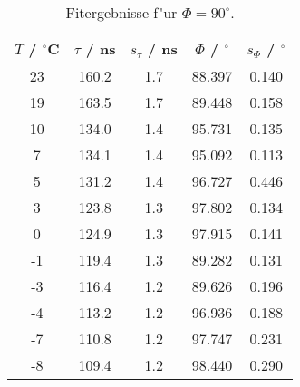 \begin{table}[H]
\caption{Fitergebnisse f"ur $\Phi=90^\circ$.}
\begin{center}
\begin{tabular}{|c|c|c|c|c|}
  \hline
  $T$ / ${}^{\circ}$C & $\tau$ / ns & $s_{\tau}$ / ns & $\Phi$ / ${}^{\circ}$ & $s_{\Phi}$ / ${}^{\circ}$ \\ \hline
  23 & 160.2 & 1.7 & 88.397 & 0.140 \\ \hline
  19 & 163.5 & 1.7 & 89.448 & 0.158 \\ \hline
  10 & 134.0 & 1.4 & 95.731 & 0.135 \\ \hline
  7 & 134.1 & 1.4 & 95.092 & 0.113 \\ \hline
  5 & 131.2 & 1.4 & 96.727 & 0.446 \\ \hline
  3 & 123.8 & 1.3 & 97.802 & 0.134 \\ \hline
  0 & 124.9 & 1.3 & 97.915 & 0.141 \\ \hline
  -1 & 119.4 & 1.3 & 89.282 & 0.131 \\ \hline
  -3 & 116.4 & 1.2 & 89.626 & 0.196 \\ \hline
  -4 & 113.2 & 1.2 & 96.936 & 0.188 \\ \hline
  -7 & 110.8 & 1.2 & 97.747 & 0.231 \\ \hline
  -8 & 109.4 & 1.2 & 98.440 & 0.290 \\ \hline
\end{tabular}
\end{center}
\label{tab:phi:90}
\end{table}
